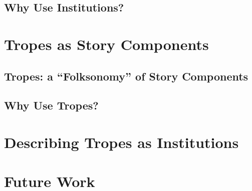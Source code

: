 \documentclass[11pt]{report}
\begin{document}
\section{Why Use Institutions?}

\chapter{Tropes as Story Components}
\label{sec:tropes}
\section{Tropes: a ``Folksonomy'' of Story Components}

\section{Why Use Tropes?}

\chapter{Describing Tropes as Institutions}
\label{sec:tropes-as-institutions}

\chapter{Future Work}
\label{sec:future}




\end{document}

